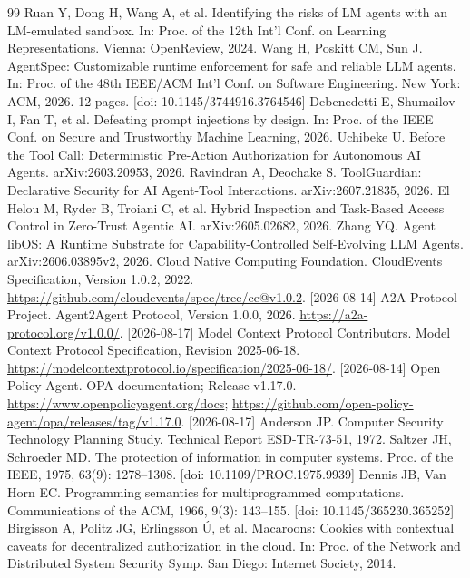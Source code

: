 {\begin{thebibliography}{99}
 Ruan Y, Dong H, Wang A, et al. Identifying the risks of LM agents with an LM-emulated sandbox. In: Proc. of the 12th Int'l Conf. on Learning Representations. Vienna: OpenReview, 2024.
 Wang H, Poskitt CM, Sun J. AgentSpec: Customizable runtime enforcement for safe and reliable LLM agents. In: Proc. of the 48th IEEE/ACM Int'l Conf. on Software Engineering. New York: ACM, 2026. 12 pages. [doi: 10.1145/3744916.3764546]
 Debenedetti E, Shumailov I, Fan T, et al. Defeating prompt injections by design. In: Proc. of the IEEE Conf. on Secure and Trustworthy Machine Learning, 2026.
 Uchibeke U. Before the Tool Call: Deterministic Pre-Action Authorization for Autonomous AI Agents. arXiv:2603.20953, 2026.
 Ravindran A, Deochake S. ToolGuardian: Declarative Security for AI Agent-Tool Interactions. arXiv:2607.21835, 2026.
 El Helou M, Ryder B, Troiani C, et al. Hybrid Inspection and Task-Based Access Control in Zero-Trust Agentic AI. arXiv:2605.02682, 2026.
 Zhang YQ. Agent libOS: A Runtime Substrate for Capability-Controlled Self-Evolving LLM Agents. arXiv:2606.03895v2, 2026.
 Cloud Native Computing Foundation. CloudEvents Specification, Version 1.0.2, 2022. \url{https://github.com/cloudevents/spec/tree/ce@v1.0.2}. [2026-08-14]
 A2A Protocol Project. Agent2Agent Protocol, Version 1.0.0, 2026. \url{https://a2a-protocol.org/v1.0.0/}. [2026-08-17]
 Model Context Protocol Contributors. Model Context Protocol Specification, Revision 2025-06-18. \url{https://modelcontextprotocol.io/specification/2025-06-18/}. [2026-08-14]
 Open Policy Agent. OPA documentation; Release v1.17.0. \url{https://www.openpolicyagent.org/docs}; \url{https://github.com/open-policy-agent/opa/releases/tag/v1.17.0}. [2026-08-17]
 Anderson JP. Computer Security Technology Planning Study. Technical Report ESD-TR-73-51, 1972.
 Saltzer JH, Schroeder MD. The protection of information in computer systems. Proc. of the IEEE, 1975, 63(9): 1278--1308. [doi: 10.1109/PROC.1975.9939]
 Dennis JB, Van Horn EC. Programming semantics for multiprogrammed computations. Communications of the ACM, 1966, 9(3): 143--155. [doi: 10.1145/365230.365252]
 Birgisson A, Politz JG, Erlingsson \'{U}, et al. Macaroons: Cookies with contextual caveats for decentralized authorization in the cloud. In: Proc. of the Network and Distributed System Security Symp. San Diego: Internet Society, 2014.

\end{thebibliography}}
